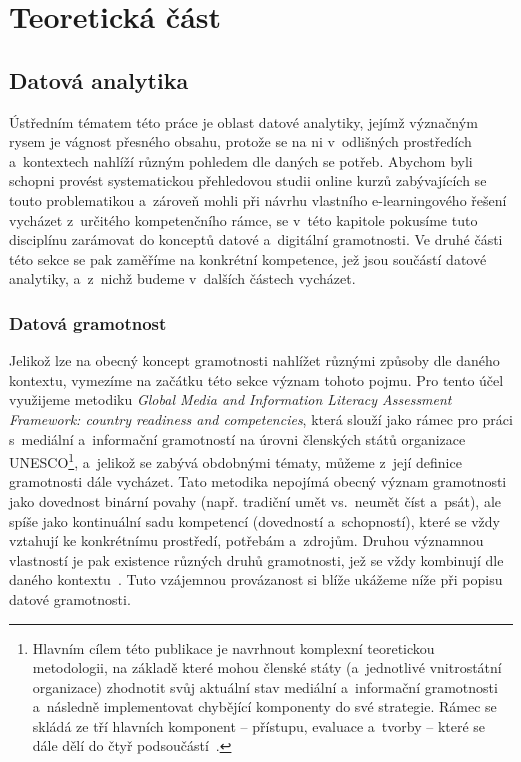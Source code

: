 \part{Teoretická část}

\hypertarget{datovuxe1-analytika}{%
\chapter{Datová analytika}\label{datovuxe1-analytika}}

Ústředním tématem této práce je oblast datové analytiky, jejímž význačným rysem je vágnost přesného obsahu, protože se na ni v~odlišných prostředích a~kontextech nahlíží různým pohledem dle daných se potřeb. Abychom byli schopni provést systematickou přehledovou studii online kurzů zabývajících se touto problematikou a~zároveň mohli při návrhu vlastního e-learningového řešení vycházet z~určitého kompetenčního rámce, se v~této kapitole pokusíme tuto disciplínu zarámovat do konceptů datové a~digitální gramotnosti. Ve druhé části této sekce se pak zaměříme na konkrétní kompetence, jež jsou součástí datové analytiky, a~z~nichž budeme v~dalších částech vycházet.

\hypertarget{datovuxe1-gramotnost}{%
\section{Datová gramotnost}\label{datovuxe1-gramotnost}}

Jelikož lze na obecný koncept gramotnosti nahlížet různými způsoby dle daného kontextu, vymezíme na začátku této sekce význam tohoto pojmu. Pro tento účel využijeme metodiku \emph{Global Media and Information Literacy Assessment Framework: country readiness and competencies}, která slouží jako rámec pro práci s~mediální a~informační gramotností na úrovni členských států organizace UNESCO\footnote{Hlavním cílem této publikace je navrhnout komplexní teoretickou metodologii, na základě které mohou členské státy (a~jednotlivé vnitrostátní organizace) zhodnotit svůj aktuální stav mediální a~informační gramotnosti a~následně implementovat chybějící komponenty do své strategie. Rámec se skládá ze tří hlavních komponent – přístupu, evaluace a~tvorby – které se dále dělí do čtyř podsoučástí~\parencite{unesco13}.}, a~jelikož se zabývá obdobnými tématy, můžeme z~její definice gramotnosti dále vycházet. Tato metodika nepojímá obecný význam gramotnosti jako dovednost binární povahy (např. tradiční umět vs.~neumět číst a~psát), ale spíše jako kontinuální sadu kompetencí (dovedností a~schopností), které se vždy vztahují ke konkrétnímu prostředí, potřebám a~zdrojům. Druhou významnou vlastností je pak existence různých druhů gramotnosti, jež se vždy kombinují dle daného kontextu~\parencite{unesco13}. Tuto vzájemnou provázanost si blíže ukážeme níže při popisu datové gramotnosti.

